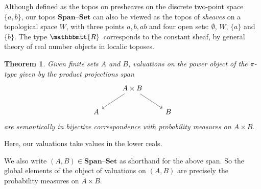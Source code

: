 \documentclass[11pt, oneside, article]{memoir}
\theoremstyle{plain}
\newtheorem{theorem}{Theorem}[chapter] %
\theoremstyle{definition}
\theoremstyle{remark}
\newcommand{\Cat}[1]{\mathbf{#1}}
\newcommand{\smset}{\Cat{Set}}
\newcommand{\internal}[1]{\raisebox{-.03ex}{$\mathbbmtt{#1}$}}
\newcommand{\hs}{\hspace{1.1pt}}
\newcommand{\tRR}{\internal{R}\hs}
\newcommand{\Span}{\Cat{Span}}
\newcommand{\set}{\text{--}\smset}
\begin{document}
Although defined as the topos on presheaves on the discrete two-point space $\{a,b\}$, our topos $\Span\set$ can also be viewed as the topos of \emph{sheaves} on a topological space $W$, with three points $a,b,ab$ and four open sets: $\emptyset$, $W$, $\{a\}$ and $\{b\}$. The type $\tRR$ corresponds to the constant sheaf, by general theory of real number objects in localic toposes.

\begin{theorem}
Given finite sets $A$ and $B$, valuations on the power object of the $\pi$-type given by the product projections span
\[\begin{tikzcd}
	& A \times B \ar{dl} \ar{dr} \\
	A & & B
\end{tikzcd}\]
are semantically in bijective correspondence with probability measures on $A\times B$.
\end{theorem}

Here, our valuations take values in the lower reals.

We also write $(A,B)\in\Span\set$ as shorthand for the above span. So the global elements of the object of valuations on $(A,B)$ are precisely the probability measures on $A\times B$.
\end{document}
